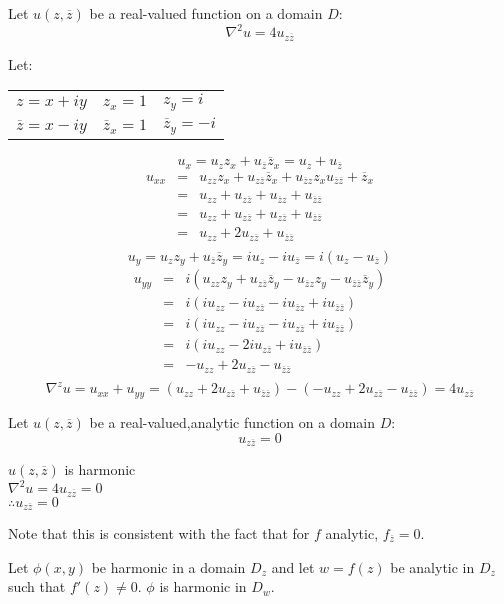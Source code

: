 \documentclass[letterpaper,12pt,fleqn]{article}
\newcommand{\n}{\nabla}
\renewcommand{\n}{\nabla}
\newcommand{\p}{\phi}
\newcommand{\conj}[1]{\overline{#1}}
\newcommand{\zb}{\conj{z}}
\begin{document}
\begin{theorem}
  Let $u(z,\zb)$ be a real-valued function on a domain $D$:
  \[\n^2{u}=4u_{z\zb}\]
\end{theorem}

\begin{theproof}
  Let:
  \begin{tabular}{lll}
    $z=x+iy$ & $z_x=1$ & $z_y=i$ \\
    $\zb=x-iy$ & $\zb_x=1$ & $\zb_y=-i$ \\
  \end{tabular}
  \[u_x=u_zz_x+u_{\zb}\zb_x=u_z+u_{\zb}\]
  \begin{eqnarray*}
    u_{xx} &=& u_{zz}z_x+u_{z\zb}\zb_x+u_{\zb z}z_xu_{\zb\zb}+\zb_x \\
    &=& u_{zz}+u_{z\zb}+u_{\zb z}+u_{\zb\zb} \\
    &=& u_{zz}+u_{z\zb}+u_{z\zb}+u_{\zb\zb} \\
    &=& u_{zz}+2u_{z\zb}+u_{\zb\zb} \\
  \end{eqnarray*}
  \[u_y=u_zz_y+u_{\zb}\zb_y=iu_z-iu_{\zb}=i(u_z-u_{\zb})\]
  \begin{eqnarray*}
    u_{yy} &=& i(u_{zz}z_y+u_{z\zb}\zb_y-u_{\zb z}z_y-u_{\zb\zb}\zb_y) \\
    &=& i(iu_{zz}-iu_{z\zb}-iu_{\zb z}+iu_{\zb\zb}) \\
    &=& i(iu_{zz}-iu_{z\zb}-iu_{z\zb}+iu_{\zb\zb}) \\
    &=& i(iu_{zz}-2iu_{z\zb}+iu_{\zb\zb}) \\
    &=& -u_{zz}+2u_{z\zb}-u_{\zb\zb} \\
  \end{eqnarray*}
  \[\n^zu=u_{xx}+u_{yy}=(u_{zz}+2u_{z\zb}+u_{\zb\zb})-(-u_{zz}+2u_{z\zb}-u_{\zb\zb})=
  4u_{z\zb}\]
\end{theproof}
\newpage
\begin{corollary}
  Let $u(z,\zb)$ be a real-valued,analytic function on a domain $D$:
  \[u_{z\zb}=0\]
\end{corollary}

\begin{theproof}
  $u(z,\zb)$ is harmonic \\
  $\n^2u=4u_{z\zb}=0$ \\
  $\therefore u_{z\zb}=0$
\end{theproof}

Note that this is consistent with the fact that for $f$ analytic, $f_{\zb}=0$.

\begin{theorem}
  Let $\p(x,y)$ be harmonic in a domain $D_z$ and let $w=f(z)$ be analytic in
  $D_z$ such that $f'(z)\ne0$. $\p$ is harmonic in $D_w$.
\end{theorem}
\end{document}
